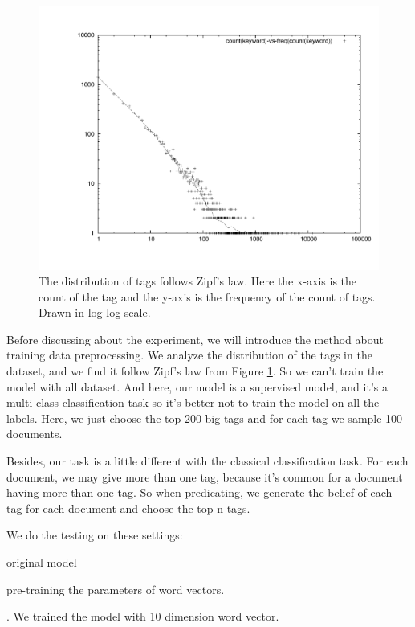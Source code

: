 \documentclass[dvips,12pt]{article}
\begin{document}
         \begin{figure}
         \includegraphics[scale=0.5]{dist.pdf}
         \caption{The distribution of tags follows Zipf's law. Here the x-axis is the count of the tag and the y-axis is the frequency of the count of tags. Drawn in log-log scale.}
         \label{zips}
        \end{figure}
        
        Before discussing about the experiment, we will introduce the method about training data preprocessing. We analyze the distribution of the tags in the dataset, and we find it follow Zipf's law from Figure \ref{zips}. So we can't train the model with all dataset. And here, our model is a supervised model, and it's a multi-class classification task so it's better not to train the model on all the labels. Here, we just choose the top 200 big tags and for each tag we sample 100 documents.
        
        Besides, our task is a little different with the classical classification task. For each document, we may give more than one tag, because it's common for a document having more than one tag. So when predicating, we generate the belief of each tag for each document and choose the top-n tags.
        
        We do the testing on these settings:\begin{inparaenum}[(i)]
            \item original model
            \item pre-training the parameters of word vectors.
        \end{inparaenum}. We trained the model with 10 dimension word vector.
        
\end{document}

